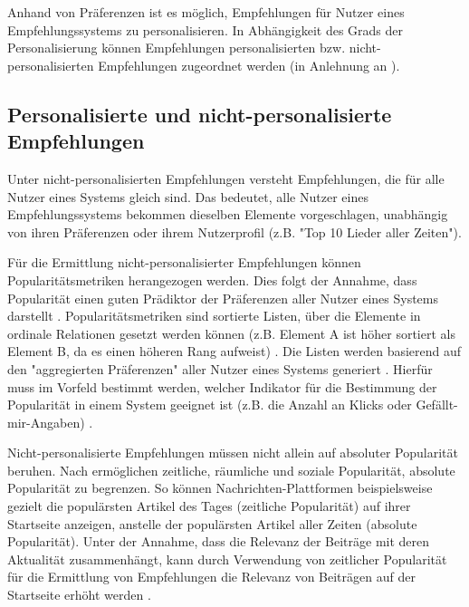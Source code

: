 Anhand von Präferenzen ist es möglich, Empfehlungen für Nutzer eines Empfehlungssystems zu personalisieren.
In Abhängigkeit des Grads der Personalisierung können Empfehlungen personalisierten bzw. nicht-personali\-sierten Empfehlungen zugeordnet werden (in Anlehnung an \cite[S. 400]{unternährer:article}).

\subsection{Personalisierte und nicht-personalisierte Empfehlungen}
\label{ch:empfehlungssysteme:preferences:personal_vs_nonpersonal}
Unter nicht-personalisierten Empfehlungen versteht \textcite[S. 400]{unternährer:article} Empfehlungen, die für alle Nutzer eines Systems gleich sind.
Das bedeutet, alle Nutzer eines Empfehlungssystems bekommen dieselben Elemente vorgeschlagen, unabhängig von ihren Präferenzen oder ihrem Nutzerprofil (z.B. "Top 10 Lieder aller Zeiten").

Für die Ermittlung nicht-personalisierter Empfehlungen können Popularitätsmetriken herangezogen werden.
Dies folgt der Annahme, dass Popularität einen guten Prädiktor der Präferenzen aller Nutzer eines Systems darstellt \cite[S. 406]{unternährer:article}.
Popularitätsmetriken sind sortierte Listen, über die Elemente in ordinale Relationen gesetzt werden können (z.B. Element A ist höher sortiert als Element B, da es einen höheren Rang aufweist) \cite[S. 404ff.]{unternährer:article}.
Die Listen werden basierend auf den "aggregierten Präferenzen" aller Nutzer eines Systems generiert \cite[S. 404]{unternährer:article}.
Hierfür muss im Vorfeld bestimmt werden, welcher Indikator für die Bestimmung der Popularität in einem System geeignet ist (z.B. die Anzahl an Klicks oder Gefällt-mir-Angaben) \cite[S. 406]{unternährer:article}.

Nicht-personalisierte Empfehlungen müssen nicht allein auf absoluter Popularität beruhen.
Nach \textcite[S. 405]{unternährer:article} ermöglichen zeitliche, räumliche und soziale Popularität, absolute Popularität zu begrenzen.
So können Nachrichten-Plattformen beispielsweise gezielt die populärsten Artikel des Tages (zeitliche Popularität) auf ihrer Startseite anzeigen, anstelle der populärsten Artikel aller Zeiten (absolute Popularität).
Unter der Annahme, dass die Relevanz der Beiträge mit deren Aktualität zusammenhängt, kann durch Verwendung von zeitlicher Popularität für die Ermittlung von Empfehlungen die Relevanz von Beiträgen auf der Startseite erhöht werden \cite[S. 405]{unternährer:article}.

